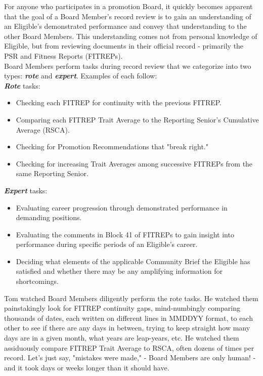 \documentclass[UTF8]{article}
\begin{document}
For anyone who participates in a promotion Board, it quickly becomes apparent
that the goal of a Board Member's record review is to gain an understanding of
an Eligible's demonstrated performance and convey that understanding to the
other Board Members. This understanding comes not from personal knowledge of
Eligible, but from reviewing documents in their official record - primarily the
PSR and Fitness Reports (FITREPs).\\


Board Members perform tasks during record review that we categorize into two
types:
\textit{\textbf{rote}} and \textit{\textbf{expert}}. Examples of each follow:\\

\textit{\textbf{Rote}} tasks: 
\begin{itemize}
  \item Checking each FITREP for continuity with the previous FITREP.
  \item Comparing each FITREP Trait Average to the Reporting Senior's Cumulative
  Average (RSCA).
  \item Checking for Promotion Recommendations that "break right."
  \item Checking for increasing Trait Averages among successive FITREPs from the
  same Reporting Senior. 
\end{itemize}

\textit{\textbf{Expert}} tasks: 
\begin{itemize}
  \item Evaluating career progression through demonstrated performance in
  demanding positions.
  \item Evaluating the comments in Block 41 of FITREPs to gain insight into 
  performance during specific periods of an Eligible's career.
  \item Deciding what elements of the applicable Community Brief the Eligible
  has satisfied and whether there may be any amplifying information for
  shortcomings.
\end{itemize}

Tom watched Board Members diligently perform the rote tasks. He watched them 
painstakingly look for FITREP continuity gaps, mind-numbingly comparing thousands 
of dates, each written on different lines in MMDDYY format, to each other to see 
if there are any days in between, trying to keep straight how many days are in a
given month, what years are leap-years, etc. He watched them assiduously compare 
FITREP Trait Average to RSCA, often dozens of times per record. Let's just say, 
"mistakes were made," - Board Members are only human! - and it took days or weeks
longer than it should have.
\end{document}
